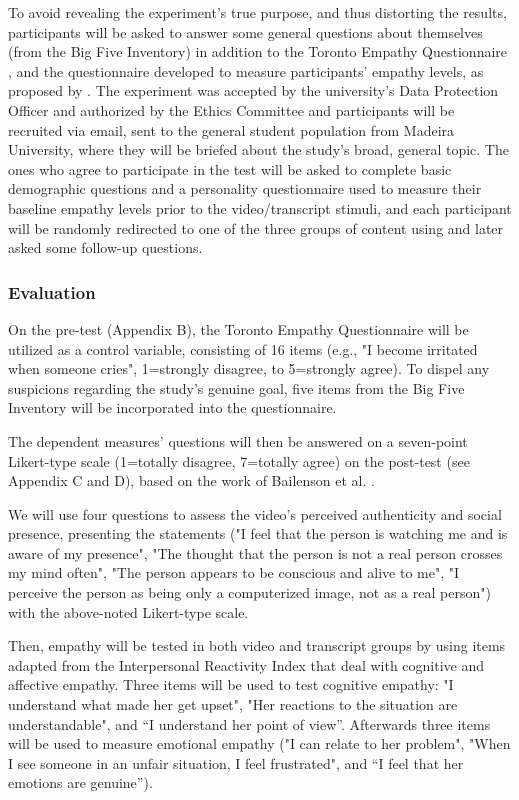 To avoid revealing the experiment's true purpose, and thus distorting the results, participants will be asked to answer some general questions about themselves (from the Big Five Inventory) in addition to the Toronto Empathy Questionnaire \cite{SPR03}, and the questionnaire developed to measure participants' empathy levels, as proposed by \cite{ROT19, ZIB19}. 
The experiment was accepted by the university's Data Protection Officer and authorized by the Ethics Committee and participants will be recruited via email, sent to the general student population from Madeira University, where they will be briefed about the study's broad, general topic.
The ones who agree to participate in the test will be asked to complete basic demographic questions and a personality questionnaire used to measure their baseline empathy levels prior to the video/transcript stimuli, and each participant will be randomly redirected to one of the three groups of content using \cite{FER19} and later asked some follow-up questions.

\subsubsection{Evaluation}
On the pre-test (Appendix B), the Toronto Empathy Questionnaire \cite{SPR03} will be utilized as a control variable, consisting of 16 items (e.g., "I become irritated when someone cries", 1=strongly disagree, to 5=strongly agree). To dispel any suspicions regarding the study's genuine goal, five items from the Big Five Inventory \cite{JOH91} will be incorporated into the questionnaire.

The dependent measures' questions will then be answered on a seven-point Likert-type scale (1=totally disagree, 7=totally agree) on the post-test (see Appendix C and D), based on the work of Bailenson et al. \cite{BAI03}.

We will use four questions to assess the video's perceived authenticity and social presence, presenting the statements ("I feel that the person is watching me and is aware of my presence", "The thought that the person is not a real person crosses my mind often", "The person appears to be conscious and alive to me", "I perceive the person as being only a computerized image, not as a real person") with the above-noted Likert-type scale.

Then, empathy will be tested in both video and transcript groups by using items adapted from the Interpersonal Reactivity Index \cite{DAV83} that deal with cognitive and affective empathy. Three items will be used to test cognitive empathy: "I understand what made her get upset", "Her reactions to the situation are understandable", and “I understand her point of view”. Afterwards three items will be used to measure emotional empathy ("I can relate to her problem", "When I see someone in an unfair situation, I feel frustrated", and “I feel that her emotions are genuine”).

